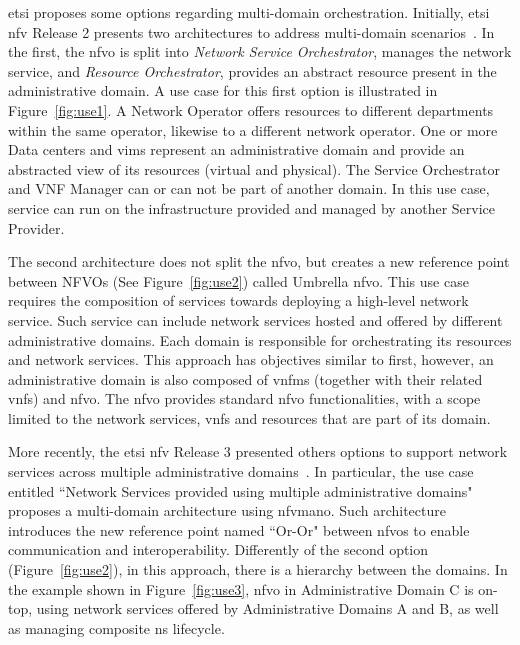 \gls{etsi} proposes some options regarding multi-domain orchestration. Initially, \gls{etsi} \gls{nfv}  Release 2 presents two architectures to address multi-domain scenarios~\cite{ETSIIndustrySpecificationGroupISGNFV2014NetworkOptions}. In the first, the \gls{nfvo} is split into \textit{Network Service Orchestrator}, manages the network service, and \textit{Resource Orchestrator}, provides an abstract resource present in the administrative domain. A use case for this first option is illustrated in Figure~\ref{fig:use1}. A Network Operator offers resources to different departments within the same operator, likewise to a different network operator. One or more Data centers and \glspl{vim} represent an administrative domain and provide an abstracted view of its resources (virtual and physical). The Service Orchestrator and VNF Manager can or can not be part of another domain. In this use case, service can run on the infrastructure provided and managed by another Service Provider.

The second architecture does not split the \gls{nfvo}, but creates a new reference point between NFVOs (See Figure~\ref{fig:use2}) called  Umbrella \gls{nfvo}. This use case requires the composition of services towards deploying a high-level network service. Such service can include network services hosted and offered by different administrative domains. Each domain is responsible for orchestrating its resources and network services. This approach has objectives similar to first, however, an administrative domain is also composed of \glspl{vnfm} (together with their related \glspl{vnf}) and \gls{nfvo}. The \gls{nfvo} provides standard \gls{nfvo} functionalities, with a scope limited to the network services, \glspl{vnf} and resources that are part of its domain.

More recently, the \gls{etsi} \gls{nfv} Release 3 presented others options to support network services across multiple administrative domains~\cite{ETSIGRDomains}. In particular, the use case entitled ``Network Services provided using multiple administrative domains" proposes a multi-domain architecture using \gls{nfvmano}. Such architecture introduces the new reference point named ``Or-Or" between \glspl{nfvo} to enable communication and interoperability. Differently of the second option (Figure~\ref{fig:use2}), in this approach, there is a hierarchy between the domains. In the example shown in Figure~\ref{fig:use3}, \gls{nfvo} in Administrative Domain C is on-top, using network services offered by Administrative Domains A and B, as well as managing composite \gls{ns} lifecycle.    


